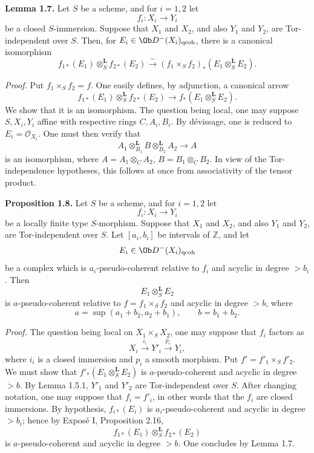 \textbf{Lemma 1.7.} Let \(S\) be a scheme, and for \(i=1,2\) let
\[
  f_i:X_i\longrightarrow Y_i
\]
be a closed \(S\)-immersion. Suppose that \(X_1\) and \(X_2\), and also \(Y_1\) and \(Y_2\), are Tor-independent over \(S\). Then, for \(E_i\in \Ob D^{-}(X_i)_{\mathrm{qcoh}}\), there is a canonical isomorphism
\[
  f_{1*}(E_1)\otimes_S^{\mathbf L} f_{2*}(E_2)
  \xrightarrow{\sim}
  (f_1\times_S f_2)_*(E_1\otimes_S^{\mathbf L}E_2).
\]

\emph{Proof.} Put \(f_1\times_Sf_2=f\). One easily defines, by adjunction, a canonical arrow
\[
  f_{1*}(E_1)\otimes_S^{\mathbf L} f_{2*}(E_2)
  \longrightarrow
  f_*(E_1\otimes_S^{\mathbf L}E_2).
\]
We show that it is an isomorphism. The question being local, one may suppose \(S,X_i,Y_i\) affine with respective rings \(C,A_i,B_i\). By dévissage, one is reduced to \(E_i=\mathcal O_{X_i}\). One must then verify that
\[
  A_1\otimes^{\mathbf L}_{B_1}B\otimes^{\mathbf L}_{B_2}A_2
  \longrightarrow A
\]
is an isomorphism, where \(A=A_1\otimes_C A_2\), \(B=B_1\otimes_C B_2\). In view of the Tor-independence hypotheses, this follows at once from associativity of the tensor product.

\textbf{Proposition 1.8.} Let \(S\) be a scheme, and for \(i=1,2\) let
\[
  f_i:X_i\longrightarrow Y_i
\]
be a locally finite type \(S\)-morphism. Suppose that \(X_1\) and \(X_2\), and also \(Y_1\) and \(Y_2\), are Tor-independent over \(S\). Let \([a_i,b_i]\) be intervals of \(\mathbb Z\), and let
\[
  E_i\in \Ob D^{-}(X_i)_{\mathrm{qcoh}}
\]
be a complex which is \(a_i\)-pseudo-coherent relative to \(f_i\) and acyclic in degree \(>b_i\). Then
\[
  E_1\otimes_S^{\mathbf L}E_2
\]
is \(a\)-pseudo-coherent relative to \(f=f_1\times_S f_2\) and acyclic in degree \(>b\), where
\[
  a=\sup(a_1+b_2,a_2+b_1),\qquad b=b_1+b_2.
\]

\emph{Proof.} The question being local on \(X_1\times_SX_2\), one may suppose that \(f_i\) factors as
\[
  X_i\xrightarrow{i_i}Y'_i\xrightarrow{p_i}Y_i,
\]
where \(i_i\) is a closed immersion and \(p_i\) a smooth morphism. Put \(f'=f'_1\times_Sf'_2\). We must show that \(f'_*(E_1\otimes_S^{\mathbf L}E_2)\) is \(a\)-pseudo-coherent and acyclic in degree \(>b\). By Lemma 1.5.1, \(Y'_1\) and \(Y'_2\) are Tor-independent over \(S\). After changing notation, one may suppose that \(f_i=f'_i\), in other words that the \(f_i\) are closed immersions. By hypothesis, \(f_{i*}(E_i)\) is \(a_i\)-pseudo-coherent and acyclic in degree \(>b_i\); hence by Exposé I, Proposition 2.16,
\[
  f_{1*}(E_1)\otimes_S^{\mathbf L}f_{2*}(E_2)
\]
is \(a\)-pseudo-coherent and acyclic in degree \(>b\). One concludes by Lemma 1.7.

